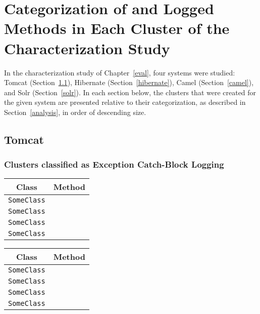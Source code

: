 
\chapter{Categorization of and Logged Methods in Each Cluster of the Characterization Study}\label{appendB}

In the characterization study of Chapter~\ref{eval}, four systems were studied: Tomcat (Section~\ref{tomcat}), Hibernate (Section~\ref{hibernate}), Camel (Section~\ref{camel}), and Solr (Section~\ref{solr}). In each section below, the clusters that were created for the given system are presented relative to their categorization, as described in Section~\ref{analysis}, in order of descending size.

\section{Tomcat}\label{tomcat}

\subsection{Clusters classified as Exception Catch-Block Logging}

\begin{center}
\begin{tabular}{ll}\toprule
\multicolumn{1}{c}{Class}&\multicolumn{1}{c}{Method}\\\midrule
\lstinline/SomeClass/&\raisebox{0pt}{\lstinline/foo(int)/}\\
\lstinline/SomeClass/&\raisebox{0pt}{\lstinline/foo(int)/}\\
\lstinline/SomeClass/&\raisebox{0pt}{\lstinline/foo(int)/}\\
\lstinline/SomeClass/&\raisebox{0pt}{\lstinline/foo(int)/}\\
\bottomrule
\end{tabular}
\end{center}

\begin{center}
\begin{tabular}{ll}\toprule
\multicolumn{1}{c}{Class}&\multicolumn{1}{c}{Method}\\\midrule
\lstinline/SomeClass/&\raisebox{0pt}{\lstinline/foo(int)/}\\
\lstinline/SomeClass/&\raisebox{0pt}{\lstinline/foo(int)/}\\
\lstinline/SomeClass/&\raisebox{0pt}{\lstinline/foo(int)/}\\
\lstinline/SomeClass/&\raisebox{0pt}{\lstinline/foo(int)/}\\
\bottomrule
\end{tabular}
\end{center}

